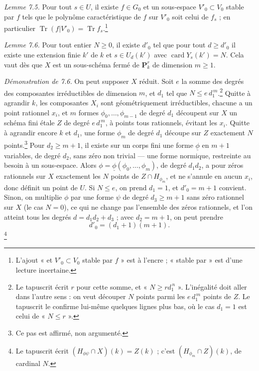 \documentclass[11pt,a4paper]{article}
\begin{document}
\emph{Lemme 7.5.} Pour tout $s \in U$, il existe $f \in G_0$ et un sous-espace
$V'_0 \subset V_0$ stable par $f$ tels que le polynôme caractéristique de $f$
sur $V'_0$ soit celui de $f_s$ ; en particulier $\operatorname{Tr}(f|V'_0) =
\operatorname{Tr} f_s$.\footnote{L'ajout « et $V'_0 \subset V_0$ stable par
$f$ » est à l'encre ; « stable par » est d'une lecture incertaine.}

\emph{Lemme 7.6.} Pour tout entier $N \geqslant 0$, il existe $d'_0$ tel que pour
tout $d \geqslant d'_0$ il existe une extension finie $k'$ de $k$ et $s \in
U_d(k')$ avec $\operatorname{card} Y_s(k') = N$. Cela vaut dès que $X$ est un
sous-schéma fermé de $\mathbf{P}^r_k$ de dimension $m \geqslant 1$.

\emph{Démonstration de 7.6.} On peut supposer $X$ réduit. Soit $e$ la somme des
degrés des composantes irréductibles de dimension $m$, et $d_1$ tel que
$N \leqslant e\, d_1^{\,m}$.\footnote{Le tapuscrit écrit $r$ pour cette somme, et
« $N \geqslant r d_1^{\,n}$ ». L'inégalité doit aller dans l'autre sens : on veut
découper $N$ points parmi les $e\,d_1^{\,m}$ points de $Z$. Le tapuscrit le
confirme lui-même quelques lignes plus bas, où le cas $d_1 = 1$ est celui de
« $N \leqslant r$ ».} Quitte à agrandir $k$, les composantes $X_i$ sont
géométriquement irréductibles, chacune a un point rationnel $x_i$, et $m$ formes
$\phi_0, \ldots, \phi_{m-1}$ de degré $d_1$ découpent sur $X$ un schéma fini
étale $Z$ de degré $e\,d_1^{\,m}$, à points tous rationnels, évitant les $x_i$.
Quitte à agrandir encore $k$ et $d_1$, une forme $\phi_m$ de degré $d_1$ découpe
sur $Z$ exactement $N$ points.\footnote{Ce pas est affirmé, non argumenté.} Pour
$d_2 \geqslant m+1$, il existe sur un corps fini une forme $\underline{\phi}$ en
$m+1$ variables, de degré $d_2$, sans zéro non trivial --- une forme normique,
restreinte au besoin à un sous-espace. Alors $\phi =
\underline{\phi}(\phi_0, \ldots, \phi_m)$, de degré $d_1d_2$, a pour zéros
rationnels sur $X$ exactement les $N$ points de $Z \cap H_{\phi_m}$, et ne
s'annule en aucun $x_i$, donc définit un point de $U$. Si $N \leqslant e$, on
prend $d_1 = 1$, et $d'_0 = m+1$ convient. Sinon, on multiplie $\phi$ par une forme
$\psi$ de degré $d_3 \geqslant m+1$ sans zéro rationnel sur $X$ (le cas $N = 0$),
ce qui ne change pas l'ensemble des zéros rationnels, et l'on atteint tous les
degrés $d = d_1d_2 + d_3$ ; avec $d_2 = m+1$, on peut prendre
\[ d'_0 = (d_1 + 1)(m+1). \]
\footnote{Le tapuscrit écrit $(H_{\phi\psi} \cap X)(k) = Z(k)$ ; c'est
$(H_{\phi_m} \cap Z)(k)$, de cardinal $N$.}
\end{document}

